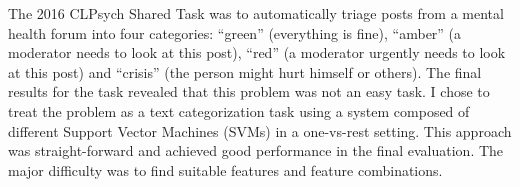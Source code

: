 The 2016 CLPsych Shared Task was to automatically triage posts from a mental health forum into four categories:  ``green'' (everything is fine), ``amber'' (a moderator needs to look at this post), ``red'' (a moderator urgently needs to look at this post) and ``crisis'' (the person might hurt himself or others). The final results for the task revealed that this problem was not an easy task. I chose to treat the problem as a text categorization task using a system composed of different Support Vector Machines (SVMs) in a one-vs-rest setting. This approach was straight-forward and achieved good performance in the final evaluation. The major difficulty was to find suitable features and feature combinations.
